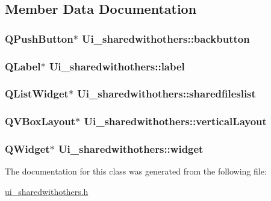 \subsection{Member Data Documentation}
\hypertarget{classUi__sharedwithothers_a2e596f92e08f9a59570e42e07752be63}{
\subsubsection[{backbutton}]{\setlength{\rightskip}{0pt plus 5cm}Q\-Push\-Button$\ast$ Ui\-\_\-sharedwithothers\-::backbutton}}\label{classUi__sharedwithothers_a2e596f92e08f9a59570e42e07752be63}
\hypertarget{classUi__sharedwithothers_ab09e33109df581cc46e9a8d6ded6623d}{
\subsubsection[{label}]{\setlength{\rightskip}{0pt plus 5cm}Q\-Label$\ast$ Ui\-\_\-sharedwithothers\-::label}}\label{classUi__sharedwithothers_ab09e33109df581cc46e9a8d6ded6623d}
\hypertarget{classUi__sharedwithothers_a004737ad9b1a45ebb50825ab793c9546}{
\subsubsection[{sharedfileslist}]{\setlength{\rightskip}{0pt plus 5cm}Q\-List\-Widget$\ast$ Ui\-\_\-sharedwithothers\-::sharedfileslist}}\label{classUi__sharedwithothers_a004737ad9b1a45ebb50825ab793c9546}
\hypertarget{classUi__sharedwithothers_af0d5af813471fcf9d32f00bec4188886}{
\subsubsection[{vertical\-Layout}]{\setlength{\rightskip}{0pt plus 5cm}Q\-V\-Box\-Layout$\ast$ Ui\-\_\-sharedwithothers\-::vertical\-Layout}}\label{classUi__sharedwithothers_af0d5af813471fcf9d32f00bec4188886}
\hypertarget{classUi__sharedwithothers_a4c922607e7b7bded9c5d8ee1af1deb98}{
\subsubsection[{widget}]{\setlength{\rightskip}{0pt plus 5cm}Q\-Widget$\ast$ Ui\-\_\-sharedwithothers\-::widget}}\label{classUi__sharedwithothers_a4c922607e7b7bded9c5d8ee1af1deb98}


The documentation for this class was generated from the following file\-:\begin{DoxyCompactItemize}
\item 
\hyperlink{ui__sharedwithothers_8h}{ui\-\_\-sharedwithothers.\-h}\end{DoxyCompactItemize}
